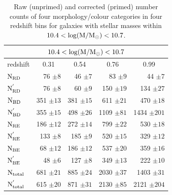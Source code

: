 \documentclass[useAMS,usenatbib]{mn2e}
\begin{document}
\begin{table}
\begin{tabular}{lrrrr}
\hline
\hline
\multicolumn{5}{c}{$10.4<\rm \log(M/M_{\odot})<10.7$}\\
\hline
\hline
\multicolumn{1}{l}{redshift} & \multicolumn{1}{c}{0.31} & \multicolumn{1}{c}{0.54} & \multicolumn{1}{c}{0.76} & \multicolumn{1}{c}{0.99} \\
\hline
$\rm N_{RD}$        & 76 $\pm 8$      & 46 $\pm 7$      & 83 $\pm 9$     & 44 $\pm 7$     \\
$\rm N^{'}_{RD}$    & 76 $\pm 8$      & 60 $\pm 9$      & 150 $\pm 19$   & 134 $\pm 27$    \\
$\rm N_{BD}$        & 351 $\pm 13$    & 381 $\pm 15$    & 611 $\pm 21$   & 470 $\pm 18$   \\
$\rm N^{'}_{BD}$    & 355 $\pm 15$    & 498 $\pm 26$    & 1109 $\pm 81$  & 1434 $\pm 201$ \\
$\rm N_{RE}$        & 186 $\pm 12$    & 272 $\pm 14$    & 799 $\pm 22$   & 530 $\pm 18$   \\
$\rm N^{'}_{RE}$    & 133 $\pm 8$     & 185 $\pm 9$     & 520 $\pm 15$   & 329 $\pm 12$    \\
$\rm N_{BE}$        & 68  $\pm 12$    & 186 $\pm 12$    & 537 $\pm 20$   & 359 $\pm 16$   \\
$\rm N^{'}_{BE}$    & 48  $\pm 6$     & 127 $\pm 8$     & 349 $\pm 13$   & 222 $\pm 10$    \\
\hline
$\rm N_{total}$     & 681 $\pm 21$    & 885 $\pm 24$    & 2030 $\pm 37$  & 1403 $\pm 31$   \\
$\rm N^{'}_{total}$ & 615 $\pm 20$    & 871 $\pm 31$    & 2130 $\pm 85$  & 2121 $\pm 204$   \\
\hline
\hline
\end{tabular}
\caption{Raw (unprimed) and corrected (primed) number counts of four morphology/colour categories in four redshift bins for galaxies with stellar masses within $\rm 10.4< \log(M/M_{\odot})<10.7$. }
\label{tab:counts_table}
\end{table}
\end{document}
